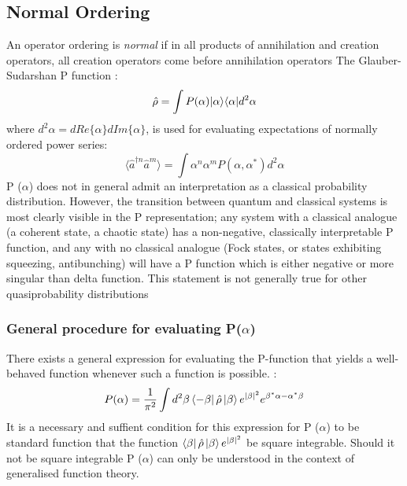 \subsection{Normal Ordering}
An operator ordering is \emph{normal} if in all products of annihilation and creation operators, all creation operators come before annihilation operators \cite{Mandl2010} The Glauber-Sudarshan P function \cite{Cahill1969}:
\begin{equation}
	\hat{\rho} = \int P(\alpha) | \alpha \rangle \langle \alpha | d^2 \alpha
	\end{equation}
where $d^2 \alpha = dRe\{\alpha \}dIm\{\alpha \}$, is used for evaluating expectations of normally ordered power series:
\begin{equation}
	\langle \hat{a}^{\dagger n} \hat{a}^{m}  \rangle = \int \alpha^n \alpha^m P (\alpha, \alpha^*) d^2 \alpha
\end{equation}
P ($\alpha$) does not in general admit an interpretation as a classical probability distribution.
However, the transition between quantum and classical systems is most clearly visible in the P representation; any system with a classical analogue (a coherent state, a chaotic state) has a non-negative, classically interpretable P function, and any with no classical analogue (Fock states, or states exhibiting squeezing, antibunching) will have a P function which is either negative or more singular than delta function.
This statement is not generally true for other quasiprobability distributions \cite{Mandel1995}
\subsubsection{General procedure for evaluating P($\alpha$)}\label{mehta}
There exists a general expression for evaluating the P-function that yields a well-behaved function whenever such a function is possible.
 \cite{Mehta1967}:
\begin{equation}
	P(\alpha) = \frac{1}{\pi^2} \int d^2 \beta \bra{-\beta} \hat{\rho} \ket{\beta} e^{|\beta|^2} e^{\beta^* \alpha -\alpha^* \beta}
\end{equation}
It is a necessary and suffient condition for this expression for P ($\alpha$) to be standard function that the function $ \bra{\beta} \hat{\rho} \ket{\beta} e^{|\beta|^2} $ be square integrable.
Should it not be square integrable P ($\alpha$) can only be understood in the context of generalised function theory.
